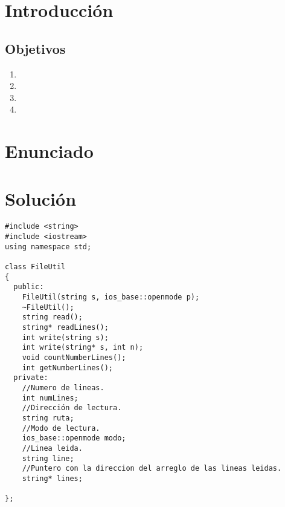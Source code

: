 \section{Introducción}


\subsection{Objetivos}
\begin{enumerate}
\item 
\item 
\item 
\item 
\end{enumerate}
\section{Enunciado}

\section{Solución}


\begin{verbatim}
#include <string>
#include <iostream>
using namespace std;

class FileUtil
{
  public:
  	FileUtil(string s, ios_base::openmode p);
  	~FileUtil();
  	string read();
  	string* readLines();
  	int write(string s);
  	int write(string* s, int n);
    void countNumberLines();
    int getNumberLines();
  private:
    //Numero de lineas.
    int numLines;
    //Dirección de lectura.
    string ruta;
    //Modo de lectura.
  	ios_base::openmode modo;
    //Linea leida.
    string line;
    //Puntero con la direccion del arreglo de las lineas leidas.
    string* lines;

};
\end{verbatim}


